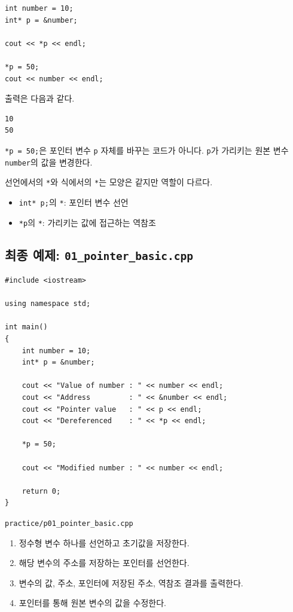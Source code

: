 \documentclass[11pt,a4paper]{article}
\begin{document}
\begin{lstlisting}
int number = 10;
int* p = &number;

cout << *p << endl;

*p = 50;
cout << number << endl;
\end{lstlisting}

출력은 다음과 같다.

\begin{verbatim}
10
50
\end{verbatim}

\texttt{*p = 50;}은 포인터 변수 \texttt{p} 자체를 바꾸는 코드가 아니다. \texttt{p}가 가리키는 원본 변수 \texttt{number}의 값을 변경한다.

\begin{importantbox}
선언에서의 \texttt{*}와 식에서의 \texttt{*}는 모양은 같지만 역할이 다르다.
\begin{itemize}[leftmargin=1.5em]
    \item \texttt{int* p;}의 \texttt{*}: 포인터 변수 선언
    \item \texttt{*p}의 \texttt{*}: 가리키는 값에 접근하는 역참조
\end{itemize}
\end{importantbox}

\subsection{최종 예제: \texttt{01\_pointer\_basic.cpp}}

\begin{lstlisting}
#include <iostream>

using namespace std;

int main()
{
    int number = 10;
    int* p = &number;

    cout << "Value of number : " << number << endl;
    cout << "Address         : " << &number << endl;
    cout << "Pointer value   : " << p << endl;
    cout << "Dereferenced    : " << *p << endl;

    *p = 50;

    cout << "Modified number : " << number << endl;

    return 0;
}
\end{lstlisting}

\begin{practicebox}
\texttt{practice/p01\_pointer\_basic.cpp}
\begin{enumerate}[leftmargin=1.5em]
    \item 정수형 변수 하나를 선언하고 초기값을 저장한다.
    \item 해당 변수의 주소를 저장하는 포인터를 선언한다.
    \item 변수의 값, 주소, 포인터에 저장된 주소, 역참조 결과를 출력한다.
    \item 포인터를 통해 원본 변수의 값을 수정한다.
\end{enumerate}
\end{practicebox}
\end{document}
